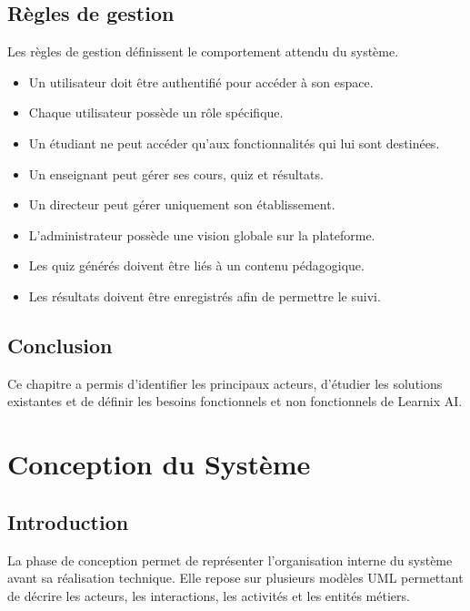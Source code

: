 \documentclass[12pt,a4paper]{report}
\begin{document}
\section{Règles de gestion}

Les règles de gestion définissent le comportement attendu du système.

\begin{itemize}
    \item Un utilisateur doit être authentifié pour accéder à son espace.
    \item Chaque utilisateur possède un rôle spécifique.
    \item Un étudiant ne peut accéder qu'aux fonctionnalités qui lui sont destinées.
    \item Un enseignant peut gérer ses cours, quiz et résultats.
    \item Un directeur peut gérer uniquement son établissement.
    \item L'administrateur possède une vision globale sur la plateforme.
    \item Les quiz générés doivent être liés à un contenu pédagogique.
    \item Les résultats doivent être enregistrés afin de permettre le suivi.
\end{itemize}

\section{Conclusion}

Ce chapitre a permis d'identifier les principaux acteurs, d'étudier les solutions existantes et de définir les besoins fonctionnels et non fonctionnels de Learnix AI.


\chapter{Conception du Système}

\section{Introduction}

La phase de conception permet de représenter l'organisation interne du système avant sa réalisation technique. Elle repose sur plusieurs modèles UML permettant de décrire les acteurs, les interactions, les activités et les entités métiers.
\end{document}
